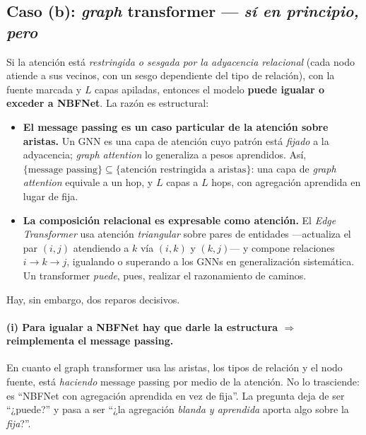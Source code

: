 \documentclass[11pt]{article}
\theoremstyle{plain}
\theoremstyle{definition}
\begin{document}
\subsection{Caso (b): \emph{graph} transformer --- \emph{sí en principio, pero}}

Si la atención está \emph{restringida o sesgada por la adyacencia relacional} (cada nodo atiende a sus
vecinos, con un sesgo dependiente del tipo de relación), con la fuente marcada y $L$ capas apiladas,
entonces el modelo \textbf{puede igualar o exceder a NBFNet}. La razón es estructural:
\begin{itemize}[leftmargin=1.4em]
  \item \textbf{El message passing es un caso particular de la atención sobre aristas.} Un GNN es una
        capa de atención cuyo patrón está \emph{fijado} a la adyacencia; \emph{graph attention}
        \cite{gat} lo generaliza a pesos aprendidos. Así, $\{\text{message passing}\}\subseteq
        \{\text{atención restringida a aristas}\}$: una capa de \emph{graph attention} equivale a un
        hop, y $L$ capas a $L$ hops, con agregación aprendida en lugar de fija.
  \item \textbf{La composición relacional es expresable como atención.} El \emph{Edge Transformer}
        \cite{edgetransformer} usa atención \emph{triangular} sobre pares de entidades ---actualiza el
        par $(i,j)$ atendiendo a $k$ vía $(i,k)$ y $(k,j)$--- y compone relaciones $i\!\to\!k\!\to\!j$,
        igualando o superando a los GNNs en generalización sistemática. Un transformer \emph{puede},
        pues, realizar el razonamiento de caminos.
\end{itemize}

Hay, sin embargo, dos reparos decisivos.

\paragraph{(i) Para igualar a NBFNet hay que darle la estructura $\Rightarrow$ reimplementa el message
passing.} En cuanto el graph transformer usa las aristas, los tipos de relación y el nodo fuente, está
\emph{haciendo} message passing por medio de la atención. No lo trasciende: es ``NBFNet con agregación
aprendida en vez de fija''. La pregunta deja de ser ``¿puede?'' y pasa a ser ``¿la agregación
\emph{blanda y aprendida} aporta algo sobre la \emph{fija}?''.
\end{document}
